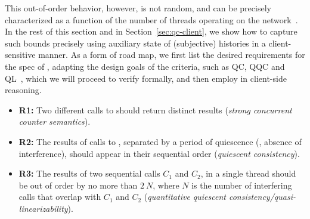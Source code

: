 \noindent

This out-of-order behavior, however, is not random, and can be
precisely characterized as a function of the number of threads
operating on the
network~\cite{Afek-al:OPODIS10,Jagadeesan-Riely:ICALP14}. In the rest
of this section and in Section~\ref{sec:qc-client}, we show how to
capture such bounds precisely using auxiliary state of (subjective)
histories in a client-sensitive manner. As a form of road map, we
first list the desired requirements for the spec of ,
%
adapting the design goals of the criteria, such as QC, QQC and
QL~\cite{Aspnes-al:JACM94,Afek-al:OPODIS10,Jagadeesan-Riely:ICALP14},
which we will proceed to verify formally, and then employ in
client-side reasoning.
%
\vspace{2pt}
\begin{itemize}

\item \textbf{R1:} Two different calls to 
  should return distinct results (\emph{strong concurrent
    counter semantics}).

\item \textbf{R2:} The results of calls to ,
  separated by a period of quiescence (\ie, absence of interference),
  should appear in their sequential order (\emph{quiescent
    consistency}).

\item \textbf{R3:} The results of two sequential calls $C_1$ and
  $C_2$, in a single thread should be out of order by no more than
  $2\ N$, where $N$ is the number of interfering calls that overlap
  with $C_1$ and $C_2$ (\emph{quantitative quiescent
    consistency/quasi-linearizability}).

\end{itemize}

